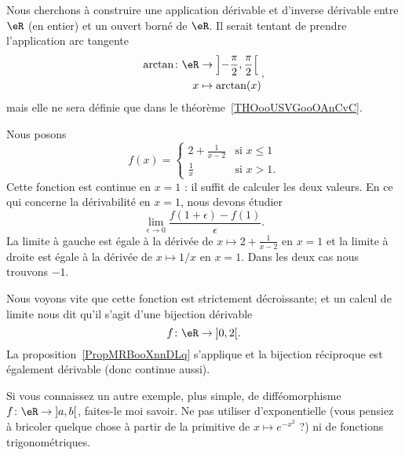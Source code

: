 \begin{example}      \label{EXooGKPNooZtmJen}
	Nous cherchons à construire une application dérivable et d'inverse dérivable entre \( \eR\) (en entier) et un ouvert borné de \( \eR\). Il serait tentant de prendre l'application arc tangente
	\begin{equation}
		\begin{aligned}
			\arctan\colon \eR & \to \left] -\frac{ \pi }{2} , \frac{ \pi }{2} \right[ \\
			x                 & \mapsto \arctan(x)
		\end{aligned},
	\end{equation}
	mais elle ne sera définie que dans le théorème~\ref{THOooUSVGooOAnCvC}.

	Nous posons
	\begin{equation}        \label{EQooOSPIooNWZBCa}
		f(x)=\begin{cases}
			2+\frac{1}{ x-2 } & \text{si } x\leq 1 \\
			\frac{1}{ x }     & \text{si } x>1.
		\end{cases}
	\end{equation}
	Cette fonction est continue en \( x=1\) : il suffit de calculer les deux valeurs. En ce qui concerne la dérivabilité en \( x=1\), nous devons étudier
	\begin{equation}
		\lim_{\epsilon\to 0}\frac{ f(1+\epsilon)-f(1) }{ \epsilon }.
	\end{equation}
	La limite à gauche est égale à la dérivée de \( x\mapsto 2+\frac{ 1 }{ x-2 }\) en \( x=1\) et la limite à droite est égale à la dérivée de \( x\mapsto 1/x\) en \( x=1\). Dans les deux cas nous trouvons \( -1\).

	\begin{center}
		
	\end{center}

	Nous voyons vite que cette fonction est strictement décroissante; et un calcul de limite nous dit qu'il s'agit d'une bijection dérivable
	\begin{equation}
		f\colon \eR\to \mathopen] 0 , 2 \mathclose[.
	\end{equation}
	La proposition~\ref{PropMRBooXnnDLq} s'applique et la bijection réciproque est également dérivable (donc continue aussi).
\end{example}

\begin{probleme}
	Si vous connaissez un autre exemple, plus simple, de difféomorphisme \( f\colon \eR\to \mathopen] a , b \mathclose[\), faites-le moi savoir. Ne pas utiliser d'exponentielle (vous pensiez à bricoler quelque chose à partir de la primitive de \( x\mapsto  e^{-x^2}\) ?) ni de fonctions trigonométriques.
\end{probleme}

